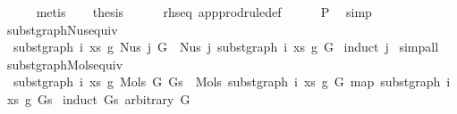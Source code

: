 \begin{isabellebody}
\ \ \ \ \isamarkupfalse%
\ metis\isanewline
\isanewline
\ \ \isamarkupfalse%
\ {\isacharquery}{\kern0pt}thesis\isanewline
\ \ \ \ \isamarkupfalse%
\ rhs{\isacharunderscore}{\kern0pt}eq\ app{\isacharunderscore}{\kern0pt}prodrule{\isacharunderscore}{\kern0pt}def\isanewline
\ \ \ \ \isamarkupfalse%
\ P{}\ \isamarkupfalse%
\ simp\isanewline
{}\isamarkupfalse%
%
\endisatagproof
{\isafoldproof}%
%
\isadelimproof
%
\endisadelimproof
%
\isadelimdocument
%
\endisadelimdocument
%
\isatagdocument
%
\isamarkuptrue%
%
\endisatagdocument
{\isafolddocument}%
%
\isadelimdocument
%
\endisadelimdocument
{}\isamarkupfalse%
\ subst{\isacharunderscore}{\kern0pt}graph{\isacharunderscore}{\kern0pt}Nus{}{\isacharunderscore}{\kern0pt}equiv{\isacharcolon}{\kern0pt}\isanewline
\ \ {\isachardoublequoteopen}subst{\isacharunderscore}{\kern0pt}graph\ i\ xs\ g{}\ {\isacharparenleft}{\kern0pt}Nus{}\ j\ G{\isacharparenright}{\kern0pt}\ {\isacharequal}{\kern0pt}\ Nus{}\ j\ {\isacharparenleft}{\kern0pt}subst{\isacharunderscore}{\kern0pt}graph\ i\ xs\ g{}\ G{\isacharparenright}{\kern0pt}{\isachardoublequoteclose}\isanewline
%
\isadelimproof
%
\endisadelimproof
%
\isatagproof
{}\isamarkupfalse%
\ {\isacharparenleft}{\kern0pt}induct\ j{\isacharparenright}{\kern0pt}\isanewline
{}\isamarkupfalse%
\ simp{\isacharunderscore}{\kern0pt}all%
\endisatagproof
{\isafoldproof}%
%
\isadelimproof
\isanewline
%
\endisadelimproof
\isanewline
\isanewline
{}\isamarkupfalse%
\ subst{\isacharunderscore}{\kern0pt}graph{\isacharunderscore}{\kern0pt}Mols{}{\isacharunderscore}{\kern0pt}equiv{\isacharcolon}{\kern0pt}\isanewline
\ \ {\isachardoublequoteopen}subst{\isacharunderscore}{\kern0pt}graph\ i\ xs\ g{}\ {\isacharparenleft}{\kern0pt}Mols{}\ G\ Gs{\isacharparenright}{\kern0pt}\ {\isacharequal}{\kern0pt}\ Mols{}\ {\isacharparenleft}{\kern0pt}subst{\isacharunderscore}{\kern0pt}graph\ i\ xs\ g{}\ G{\isacharparenright}{\kern0pt}\ {\isacharparenleft}{\kern0pt}map\ {\isacharparenleft}{\kern0pt}subst{\isacharunderscore}{\kern0pt}graph\ i\ xs\ g{}{\isacharparenright}{\kern0pt}\ Gs{\isacharparenright}{\kern0pt}{\isachardoublequoteclose}\isanewline
%
\isadelimproof
%
\endisadelimproof
%
\isatagproof
{}\isamarkupfalse%
\ {\isacharparenleft}{\kern0pt}induct\ Gs\ arbitrary{\isacharcolon}{\kern0pt}\ G{\isacharparenright}{\kern0pt}\isanewline

\end{isabellebody}
